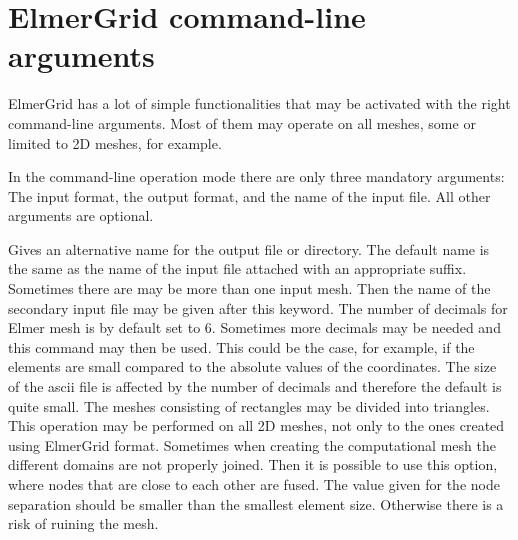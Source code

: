 \section{ElmerGrid command-line arguments}

ElmerGrid has a lot of simple functionalities that may be activated 
with the right command-line arguments. Most of them may operate on
all meshes, some or limited to 2D meshes, for example. 

In the command-line operation mode
there are only three mandatory arguments: The input format,
the output format, and the name of the input file.
All other arguments are optional.

\sifbegin
{}
Gives an alternative name for the output file or directory. 
The default name is the same as the name of the input file
attached with an appropriate suffix. 
%
Sometimes there are may be more than one input mesh. 
Then the name of the secondary input file may be given 
after this keyword.
%
The number of decimals for Elmer mesh is by default set to 6.
Sometimes more decimals may be needed and this command may then
be used. This could be the case, for example, if the elements are 
small compared to the absolute values of the coordinates.
The size of the ascii file is affected by the number of 
decimals and therefore the default is quite small.
%
The meshes consisting of rectangles may be divided into 
triangles. This operation may be performed on all 2D meshes, 
not only to the ones created using ElmerGrid format.
%
Sometimes when creating the computational mesh the 
different domains are not properly joined. Then it is possible to 
use this option, where nodes that are close to each other are
fused. The value given for the node separation should be smaller than
the smallest element size. Otherwise there is a risk of ruining the mesh.


